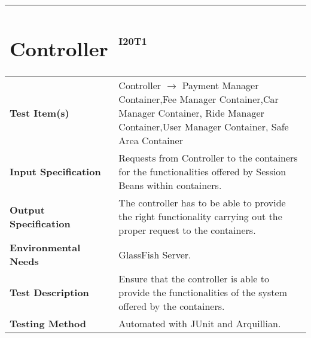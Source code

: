 \begin{tabular}{l p{}}
\section{Controller}

\begin{tabular}{l p{}}
    \hline
    \textbf{Test Case Identifier} & I20T1\\
    \hline
    \textbf{Test Item(s)} & Controller $\rightarrow$ Payment Manager Container,Fee Manager Container,Car Manager Container, Ride Manager Container,User Manager Container, Safe Area Container\\
    \hline
    \textbf{Input Specification} & Requests from Controller to the containers for the functionalities offered by Session Beans within containers. \\
    \hline
    \textbf{Output Specification} &  The controller has to be able to provide the right functionality carrying out the proper request to the containers.\\
    \hline
    \textbf{Environmental Needs} & GlassFish Server. \\
    \hline
    \textbf{Test Description} & Ensure that the controller is able to provide the functionalities of the system offered by the containers.\\
    \hline
    \textbf{Testing Method} & Automated with JUnit and Arquillian.\\
    \hline
\end{tabular}